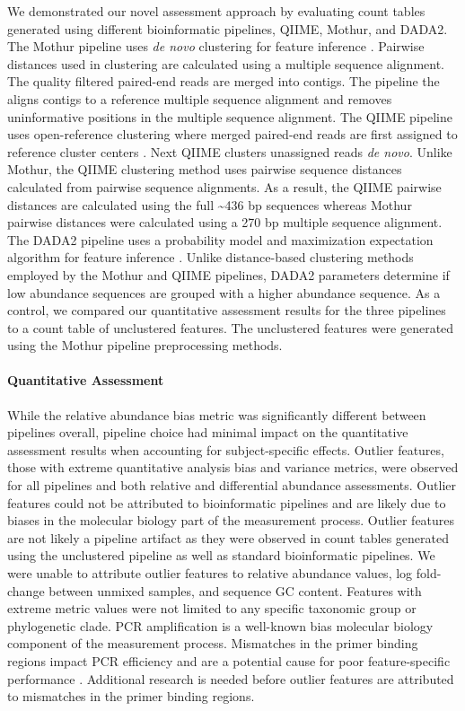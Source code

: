\documentclass{bmcart}
\begin{document}
We demonstrated our novel assessment approach by evaluating count tables
generated using different bioinformatic pipelines, QIIME, Mothur, and
DADA2. The Mothur pipeline uses \emph{de novo} clustering for feature
inference \cite{westcott2017opticlust,schloss2009introducing}.
Pairwise distances used in clustering are calculated using a multiple
sequence alignment. The quality filtered paired-end reads are merged
into contigs. The pipeline the aligns contigs to a reference multiple
sequence alignment and removes uninformative positions in the multiple
sequence alignment. The QIIME pipeline uses open-reference clustering
where merged paired-end reads are first assigned to reference cluster
centers \cite{Rideout2014,Caporaso2010}. Next QIIME clusters
unassigned reads \emph{de novo}. Unlike Mothur, the QIIME clustering
method uses pairwise sequence distances calculated from pairwise
sequence alignments. As a result, the QIIME pairwise distances are
calculated using the full \textasciitilde{}436 bp sequences whereas
Mothur pairwise distances were calculated using a 270 bp multiple
sequence alignment. The DADA2 pipeline uses a probability model and
maximization expectation algorithm for feature inference
\cite{callahan2016dada2}. Unlike distance-based clustering methods
employed by the Mothur and QIIME pipelines, DADA2 parameters determine
if low abundance sequences are grouped with a higher abundance sequence.
As a control, we compared our quantitative assessment results for the
three pipelines to a count table of unclustered features. The
unclustered features were generated using the Mothur pipeline
preprocessing methods.


\paragraph*{Quantitative Assessment}

While the relative abundance bias metric was significantly different
between pipelines overall, pipeline choice had minimal impact on the
quantitative assessment results when accounting for subject-specific
effects. Outlier features, those with extreme quantitative analysis bias
and variance metrics, were observed for all pipelines and both relative
and differential abundance assessments. Outlier features could not be
attributed to bioinformatic pipelines and are likely due to biases in
the molecular biology part of the measurement process. Outlier features
are not likely a pipeline artifact as they were observed in count tables
generated using the unclustered pipeline as well as standard
bioinformatic pipelines. We were unable to attribute outlier features to
relative abundance values, log fold-change between unmixed samples, and
sequence GC content. Features with extreme metric values were not
limited to any specific taxonomic group or phylogenetic clade. PCR
amplification is a well-known bias molecular biology component of the
measurement process. Mismatches in the primer binding regions impact PCR
efficiency and are a potential cause for poor feature-specific
performance \cite{wright2014exploiting}. Additional research is
needed before outlier features are attributed to mismatches in the
primer binding regions.
\end{document}
